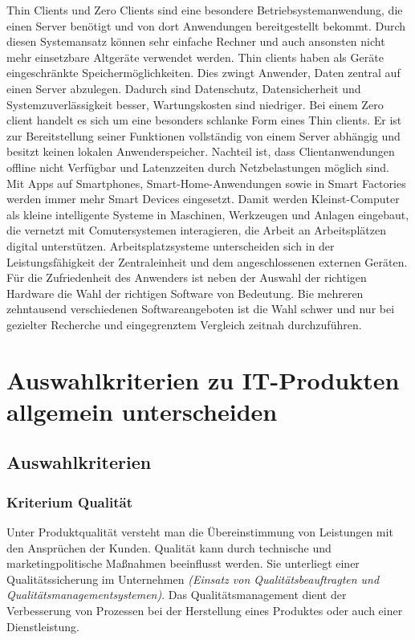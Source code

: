 \documentclass[a4paper, 12pt]{report}
\begin{document}
\begin{multicols}{2}
Thin Clients und Zero Clients sind eine besondere Betriebsystemanwendung, die
einen Server benötigt und von dort Anwendungen bereitgestellt bekommt. Durch
diesen Systemansatz können sehr einfache Rechner und auch ansonsten nicht mehr
einsetzbare Altgeräte verwendet werden. Thin clients haben als Geräte
eingeschränkte Speichermöglichkeiten. Dies zwingt Anwender, Daten zentral auf
einen Server abzulegen. Dadurch sind Datenschutz, Datensicherheit und
Systemzuverlässigkeit besser, Wartungskosten sind niedriger. Bei einem Zero
client handelt es sich um eine besonders schlanke Form eines Thin clients.
Er ist zur Bereitstellung seiner Funktionen vollständig von einem Server
abhängig und besitzt keinen lokalen Anwenderspeicher. Nachteil ist, dass
Clientanwendungen offline nicht Verfügbar und Latenzzeiten durch Netzbelastungen
möglich sind. \\

Mit Apps auf Smartphones, Smart-Home-Anwendungen sowie in Smart Factories werden
immer mehr Smart Devices eingesetzt. Damit werden Kleinst-Computer als kleine
intelligente Systeme in Maschinen, Werkzeugen und Anlagen eingebaut, die
vernetzt mit Comutersystemen interagieren, die Arbeit an Arbeitsplätzen digital
unterstützen. Arbeitsplatzsysteme unterscheiden sich in der Leistungsfähigkeit
der Zentraleinheit und dem angeschlossenen externen Geräten. \\

Für die Zufriedenheit des Anwenders ist neben der Auswahl der richtigen Hardware
die Wahl der richtigen Software von Bedeutung. Bie mehreren zehntausend
verschiedenen Softwareangeboten ist die Wahl schwer und nur bei gezielter
Recherche und eingegrenztem Vergleich zeitnah durchzuführen.

\section{Auswahlkriterien zu IT-Produkten allgemein unterscheiden}

\subsection{Auswahlkriterien}

\subsubsection{Kriterium Qualität}

Unter Produktqualität versteht man die Übereinstimmung von Leistungen mit den
Ansprüchen der Kunden. Qualität kann durch technische und marketingpolitische
Maßnahmen beeinflusst werden. Sie unterliegt einer Qualitätssicherung im
Unternehmen \emph{(Einsatz von Qualitätsbeauftragten und
Qualitätsmanagementsystemen)}. Das Qualitätsmanagement dient der Verbesserung
von Prozessen bei der Herstellung eines Produktes oder auch einer
Dienstleistung. \\


\end{multicols}
\end{document}

